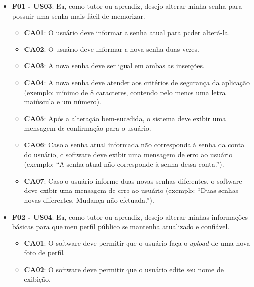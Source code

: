 \begin{itemize}
\begin{itemize}
\end{itemize}

\item \textbf{F01 - US03}: Eu, como tutor ou aprendiz, desejo alterar minha senha para possuir uma senha mais fácil de memorizar.

\begin{itemize}

\item \textbf{CA01}: O usuário deve informar a senha atual para poder alterá-la.

\item \textbf{CA02}: O usuário deve informar a nova senha duas vezes.

\item \textbf{CA03}: A nova senha deve ser igual em ambas as inserções.

\item \textbf{CA04}: A nova senha deve atender aos critérios de segurança da aplicação (exemplo: mínimo de 8 caracteres, contendo pelo menos uma letra maiúscula e um número).

\item \textbf{CA05}: Após a alteração bem-sucedida, o sistema deve exibir uma mensagem de confirmação para o usuário.

\item \textbf{CA06}: Caso a senha atual informada não corresponda à senha da conta do usuário, o software deve exibir uma mensagem de erro ao usuário (exemplo: ``A senha atual não corresponde à senha dessa conta.'').

\item \textbf{CA07}: Caso o usuário informe duas novas senhas diferentes, o software deve exibir uma mensagem de erro ao usuário (exemplo: ``Duas senhas novas diferentes. Mudança não efetuada.'').

\end{itemize}

\item \textbf{F02 - US04}: Eu, como tutor ou aprendiz, desejo alterar minhas informações básicas para que meu perfil público se mantenha atualizado e confiável.

\begin{itemize}

\item \textbf{CA01}: O software deve permitir que o usuário faça o \textit{upload} de uma nova foto de perfil.

\item \textbf{CA02}: O software deve permitir que o usuário edite seu nome de exibição.


\end{itemize}
\end{itemize}
